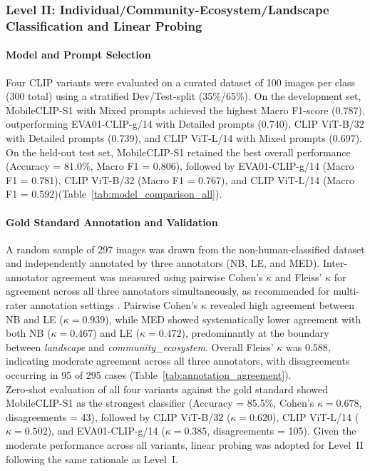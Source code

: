 \documentclass[hidelinks, 11pt]{article}
\begin{document}
\subsubsection{Level II: Individual/Community-Ecosystem/Landscape 
Classification and Linear Probing}
\label{sec:level2}

\paragraph{Model and Prompt Selection}

Four CLIP variants were evaluated on a curated dataset of 100 images per class (300 total) using a stratified Dev/Test-split (35\%/65\%). On the development set, MobileCLIP-S1 with Mixed prompts achieved the highest Macro F1-score (0.787), outperforming EVA01-CLIP-g/14 with Detailed prompts (0.740), CLIP ViT-B/32 with Detailed prompts (0.739), and CLIP ViT-L/14 with Mixed prompts 
(0.697). On the held-out test set, MobileCLIP-S1 retained the best overall performance (Accuracy = 81.0\%, Macro F1 = 0.806), followed by EVA01-CLIP-g/14 (Macro F1 = 0.781), CLIP ViT-B/32 (Macro F1 = 0.767), and CLIP ViT-L/14 (Macro F1 = 0.592)(Table~\ref{tab:model_comparison_all}).

\paragraph{Gold Standard Annotation and Validation}

A random sample of 297 images was drawn from the non-human-classified dataset 
and independently annotated by three annotators (NB, LE, and MED). 
Inter-annotator agreement was measured using pairwise Cohen's $\kappa$ \citep{cohen_coefficient_1960} and Fleiss' $\kappa$ \citep{fleiss_measuring_1971} for agreement across all three annotators simultaneously, as recommended for multi-rater annotation settings \citep{artstein_survey_2008}. Pairwise Cohen's 
$\kappa$ revealed high agreement between NB and LE ($\kappa = 0.939$), while MED showed systematically lower agreement with both NB ($\kappa = 0.467$) and LE ($\kappa = 0.472$), predominantly at the boundary between \textit{landscape} 
and \textit{community\_ecosystem}. Overall Fleiss' $\kappa$ was 0.588, indicating moderate agreement across all three annotators, with disagreements occurring in 95 of 295 cases (Table~\ref{tab:annotation_agreement}).
\\
Zero-shot evaluation of all four variants against the gold standard showed MobileCLIP-S1 as the strongest classifier (Accuracy = 85.5\%, Cohen's $\kappa = 0.678$, disagreements = 43), followed by CLIP ViT-B/32 ($\kappa = 0.620$), CLIP ViT-L/14 ($\kappa = 0.502$), and EVA01-CLIP-g/14 ($\kappa = 0.385$, disagreements = 105). Given the moderate performance across all variants, linear probing was adopted for Level~II following the same rationale as Level~I.
\end{document}
